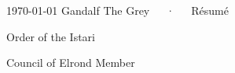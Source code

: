 \documentclass[11pt, a4paper]{awesome-cv}
\begin{document}
\makecvheader[C]
\vspace{2mm}

\makecvfooter
  {\today}
  {Gandalf The Grey~~~·~~~Résumé}
  {\thepage}


\newcommand*{\qualstyle}[1]{{\fontsize{10.5pt}{1.2em}\bodyfont\color{graytext} #1}}
\vspace{4mm}
\begin{cvitems}
    
    \item{\qualstyle{Order of the Istari}}
    
    \item{\qualstyle{Council of Elrond Member}}

\end{cvitems}
\vspace{4mm}
\end{document}
